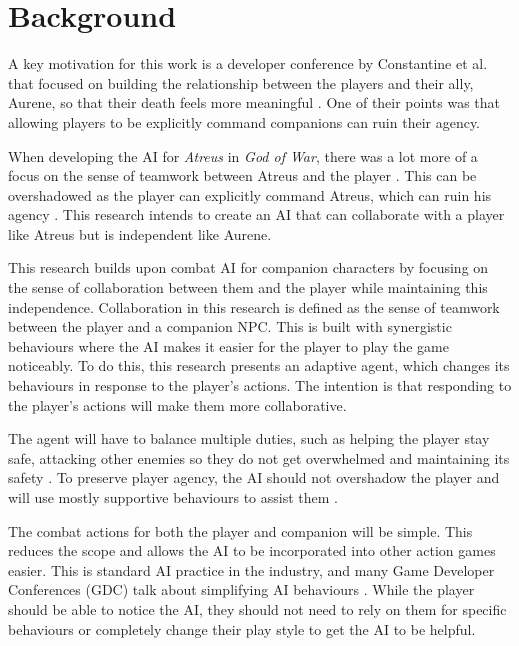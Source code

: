 \documentclass{IEEEtran}
\begin{document}
\section{Background}
\label{Background}


A key motivation for this work is a developer conference by Constantine et al. that focused on building the relationship between the players and their ally, Aurene, so that their death feels more meaningful \cite{EGXCharacterDeathGuildWars}. One of their points was that allowing players to be explicitly command companions can ruin their agency.

When developing the AI for \textit{Atreus} in \textit{God of War}, there was a lot more of a focus on the sense of teamwork between Atreus and the player \cite{GDCAtreus}. This can be overshadowed as the player can explicitly command Atreus, which can ruin his agency \cite{EGXCharacterDeathGuildWars}. This research intends to create an AI that can collaborate with a player like Atreus but is independent like Aurene.

This research builds upon combat AI for companion characters by focusing on the sense of collaboration between them and the player while maintaining this independence. Collaboration in this research is defined as the sense of teamwork between the player and a companion NPC. This is built with synergistic behaviours where the AI makes it easier for the player to play the game noticeably. To do this, this research presents an adaptive agent, which changes its behaviours in response to the player's actions. The intention is that responding to the player's actions will make them more collaborative.

The agent will have to balance multiple duties, such as helping the player stay safe, attacking other enemies so they do not get overwhelmed and maintaining its safety \cite{CoupledEmpowermentMaximisation, tremblay2013adaptive}. To preserve player agency, the AI should not overshadow the player and will use mostly supportive behaviours to assist them \cite{DesignDocAIAllies}.

The combat actions for both the player and companion will be simple. This reduces the scope and allows the AI to be incorporated into other action games easier. This is standard AI practice in the industry, and many Game Developer Conferences (GDC) talk about simplifying AI behaviours \cite{GDCLessIsMore, GDCSimplestAITrick}. While the player should be able to notice the AI, they should not need to rely on them for specific behaviours or completely change their play style to get the AI to be helpful.
\end{document}
